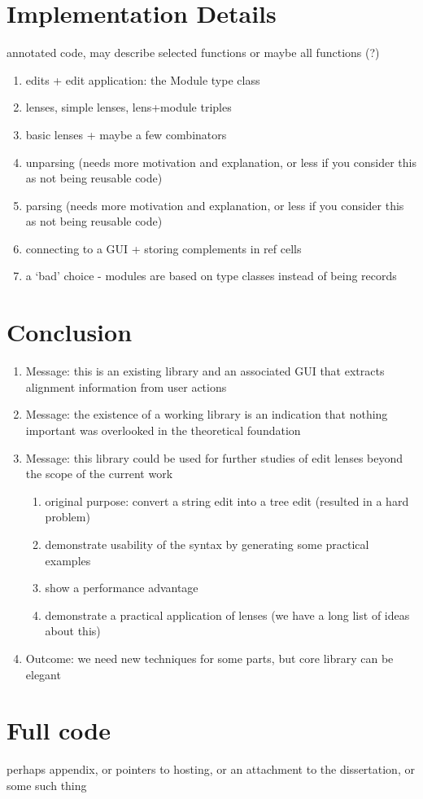 \section{Implementation Details}
\label{sec:impl-details}
annotated code, may describe selected functions or maybe all functions (?)
\begin{enumerate}
    \item edits + edit application: the Module type class
    \item lenses, simple lenses, lens+module triples
    \item basic lenses + maybe a few combinators
    \item unparsing (needs more motivation and explanation, or less if you consider this as not being reusable code)
    \item parsing (needs more motivation and explanation, or less if you consider this as not being reusable code)
    \item connecting to a GUI + storing complements in ref cells
    \item a `bad' choice - modules are based on type classes instead of being records
\end{enumerate}

\section{Conclusion}
\label{sec:impl-conclusion}
\begin{enumerate}
    \item Message: this is an existing library and an associated GUI that extracts alignment information from user actions
    \item Message: the existence of a working library is an indication that nothing important was overlooked in the theoretical foundation
    \item Message: this library could be used for further studies of edit lenses beyond the scope of the current work
        \begin{enumerate}
            \item original purpose: convert a string edit into a tree edit (resulted in a hard problem)
            \item demonstrate usability of the syntax by generating some practical examples
            \item show a performance advantage
            \item demonstrate a practical application of lenses (we have a long list of ideas about this)
        \end{enumerate}
    \item Outcome: we need new techniques for some parts, but core library can be elegant
\end{enumerate}

\section{Full code}
\label{sec:impl-code}
perhaps appendix, or pointers to hosting, or an attachment to the dissertation, or some such thing
